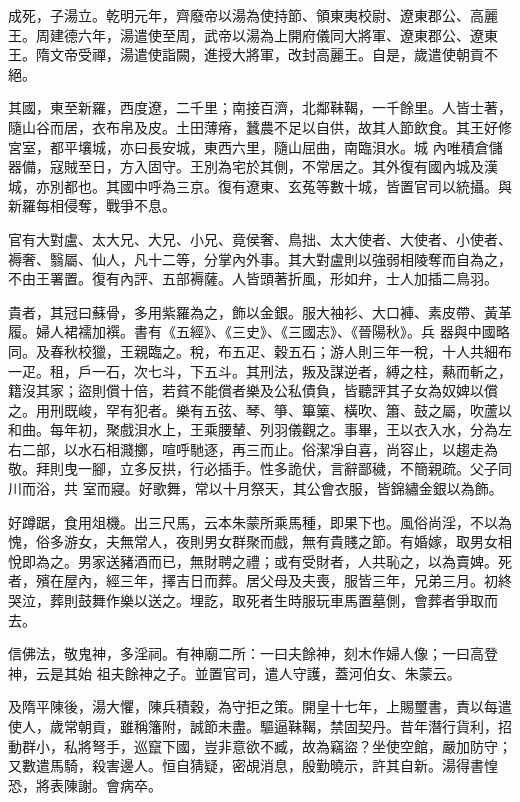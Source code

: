 \begin{pinyinscope}
 成死，子湯立。乾明元年，齊廢帝以湯為使持節、領東夷校尉、遼東郡公、高麗王。周建德六年，湯遣使至周，武帝以湯為上開府儀同大將軍、遼東郡公、遼東王。隋文帝受禪，湯遣使詣闕，進授大將軍，改封高麗王。自是，歲遣使朝貢不絕。



 其國，東至新羅，西度遼，二千里；南接百濟，北鄰靺鞨，一千餘里。人皆士著，隨山谷而居，衣布帛及皮。土田薄瘠，蠶農不足以自供，故其人節飲食。其王好修宮室，都平壤城，亦曰長安城，東西六里，隨山屈曲，南臨浿水。城
 內唯積倉儲器備，寇賊至日，方入固守。王別為宅於其側，不常居之。其外復有國內城及漢城，亦別都也。其國中呼為三京。復有遼東、玄菟等數十城，皆置官司以統攝。與新羅每相侵奪，戰爭不息。



 官有大對盧、太大兄、大兄、小兄、竟侯奢、鳥拙、太大使者、大使者、小使者、褥奢、翳屬、仙人，凡十二等，分掌內外事。其大對盧則以強弱相陵奪而自為之，不由王署置。復有內評、五部褥薩。人皆頭著折風，形如弁，士人加插二鳥羽。



 貴者，其冠曰蘇骨，多用紫羅為之，飾以金銀。服大袖衫、大口褲、素皮帶、黃革履。婦人裙襦加襈。書有《五經》、《三史》、《三國志》、《晉陽秋》。兵
 器與中國略同。及春秋校獵，王親臨之。稅，布五疋、穀五石；游人則三年一稅，十人共細布一疋。租，戶一石，次七斗，下五斗。其刑法，叛及謀逆者，縛之柱，爇而斬之，籍沒其家；盜則償十倍，若貧不能償者樂及公私債負，皆聽評其子女為奴婢以償之。用刑既峻，罕有犯者。樂有五弦、琴、箏、篳篥、橫吹、簫、鼓之屬，吹蘆以和曲。每年初，聚戲浿水上，王乘腰輦、列羽儀觀之。事畢，王以衣入水，分為左右二部，以水石相濺擲，喧呼馳逐，再三而止。俗潔凈自喜，尚容止，以趨走為敬。拜則曳一腳，立多反拱，行必插手。性多詭伏，言辭鄙穢，不簡親疏。父子同川而浴，共
 室而寢。好歌舞，常以十月祭天，其公會衣服，皆錦繡金銀以為飾。



 好蹲踞，食用俎機。出三尺馬，云本朱蒙所乘馬種，即果下也。風俗尚淫，不以為愧，俗多游女，夫無常人，夜則男女群聚而戲，無有貴賤之節。有婚嫁，取男女相悅即為之。男家送豬酒而已，無財聘之禮；或有受財者，人共恥之，以為賣婢。死者，殯在屋內，經三年，擇吉日而葬。居父母及夫喪，服皆三年，兄弟三月。初終哭泣，葬則鼓舞作樂以送之。埋訖，取死者生時服玩車馬置墓側，會葬者爭取而去。



 信佛法，敬鬼神，多淫祠。有神廟二所：一曰夫餘神，刻木作婦人像；一曰高登神，云是其始
 祖夫餘神之子。並置官司，遣人守護，蓋河伯女、朱蒙云。



 及隋平陳後，湯大懼，陳兵積穀，為守拒之策。開皇十七年，上賜璽書，責以每遣使人，歲常朝貢，雖稱籓附，誠節未盡。驅逼靺鞨，禁固契丹。昔年潛行貨利，招動群小，私將弩手，巡竄下國，豈非意欲不臧，故為竊盜？坐使空館，嚴加防守；又數遣馬騎，殺害邊人。恒自猜疑，密覘消息，殷勤曉示，許其自新。湯得書惶恐，將表陳謝。會病卒。




\end{pinyinscope}
